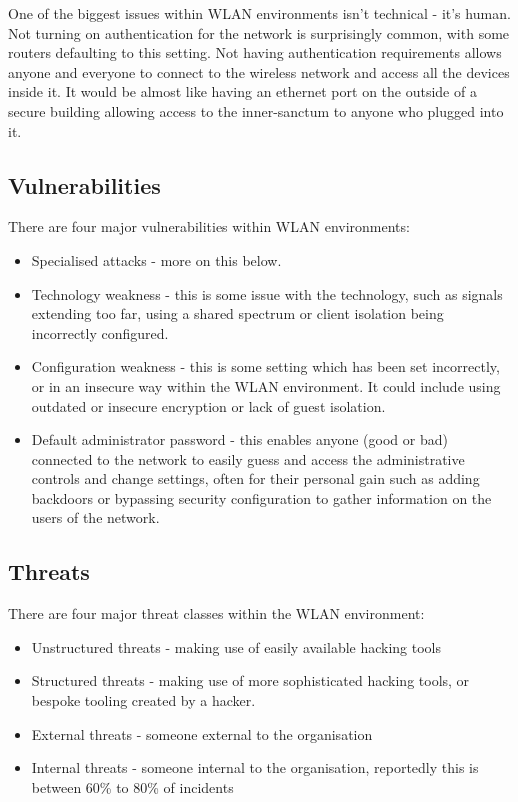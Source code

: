 One of the biggest issues within WLAN environments isn't technical - it's human. Not turning on authentication for the network is surprisingly common, with some routers defaulting to this setting. Not having authentication requirements allows anyone and everyone to connect to the wireless network and access all the devices inside it. It would be almost like having an ethernet port on the outside of a secure building allowing access to the inner-sanctum to anyone who plugged into it. 

\subsection{Vulnerabilities}
There are four major vulnerabilities within WLAN environments:
\begin{itemize}
    \item Specialised attacks - more on this below.
    \item Technology weakness - this is some issue with the technology, such as signals extending too far, using a shared spectrum or client isolation being incorrectly configured.
    \item Configuration weakness - this is some setting which has been set incorrectly, or in an insecure way within the WLAN environment. It could include using outdated or insecure encryption or lack of guest isolation. 
    \item Default administrator password - this enables anyone (good or bad) connected to the network to easily guess and access the administrative controls and change settings, often for their personal gain such as adding backdoors or bypassing security configuration to gather information on the users of the network.
\end{itemize}

\subsection{Threats}
There are four major threat classes within the WLAN environment:
\begin{itemize}
    \item Unstructured threats - making use of easily available hacking tools
    \item Structured threats - making use of more sophisticated hacking tools, or bespoke tooling created by a hacker.
    \item External threats - someone external to the organisation
    \item Internal threats - someone internal to the organisation, reportedly this is between 60\% to 80\% of incidents
\end{itemize}

